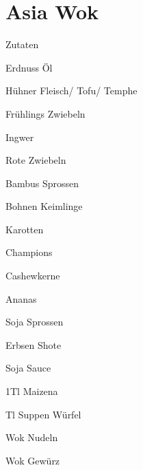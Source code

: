 \chapter*{Asia Wok}
\begin{multicols}{2}
 {\Large Zutaten}
 \begin{Zutaten}
		\item Erdnuss Öl
		\item Hühner Fleisch/ Tofu/ Temphe
		\item Frühlings Zwiebeln
		\item Ingwer
		\item Rote Zwiebeln
		\item Bambus Sprossen
		\item Bohnen Keimlinge
		\item Karotten
		\item Champions
		\item Cashewkerne
		\item Ananas
		\item Soja Sprossen
		\item Erbsen Shote
		\item Soja Sauce
		\item 1Tl Maizena
		\item {}Tl Suppen Würfel
		\item Wok Nudeln
		\item Wok Gewürz
		
		
					
		
\end{Zutaten}
\columnbreak
\end{multicols}

